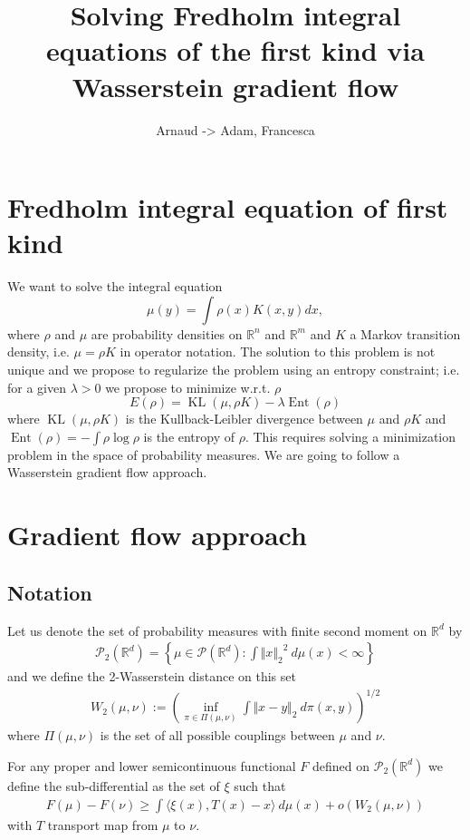 \documentclass[a4paper]{article}
\title{Solving Fredholm integral equations of the first kind via Wasserstein gradient flow}
\author{Arnaud -> Adam, Francesca }
\date{ }
\DeclareMathOperator{\KL}{KL}
\DeclareMathOperator{\ent}{Ent}
\newcommand{\norm}[2]{\ensuremath{\Vert #1 \Vert_{#2}}}
\def\real{\mathbb{R}}
\begin{document}
\maketitle

\section{Fredholm integral equation of first kind}

We want to solve the integral equation
\[
\mu(y)=\int\rho\left(x\right)K(x,y)dx,
\]
where $\rho$ and $\mu$ are probability densities on $\real^{n}$ and $\real^{m}$ and $K$ a Markov transition density, i.e. $\mu=\rho K$ in operator notation. The solution to this problem is not unique and we propose to regularize the problem using an entropy constraint; i.e. for a given $\lambda>0$ we propose to minimize w.r.t. $\rho$
\begin{equation}
\label{eq:minimisation}
E(\rho)=\KL(\mu,\rho K)-\lambda\ent(\rho)
\end{equation}
where 
$\KL(\mu,\rho K)$ is the Kullback-Leibler divergence between $\mu$ and $\rho K$ and $\ent(\rho)=-\int\rho\log\rho$ is the entropy of $\rho$.
This requires solving a minimization problem in the space of probability measures. We are going to follow a Wasserstein gradient flow approach.

\section{Gradient flow approach}
\subsection{Notation}

Let us denote the set of probability measures with finite second moment on $\real^d$ by
\begin{align*}
\mathcal{P}_2(\real^d) = \left\lbrace \mu\in \mathcal{P}(\real^d): \int \norm{ x}{2}^2 \ d\mu(x)< \infty\right\rbrace
\end{align*}
and we define the 2-Wasserstein distance on this set
\begin{align*}
W_2(\mu, \nu) := \left( \inf_{\pi\in\Pi(\mu, \nu)}\int\norm{x - y}{2}\ d\pi(x, y)\right)^{1/2}
\end{align*}
where $\Pi(\mu, \nu)$ is the set of all possible couplings between $\mu$ and $\nu$.

For any proper and lower semicontinuous functional $F$ defined on $\mathcal{P}_2(\real^d)$ we define the sub-differential as the set of $\xi$ such that
\begin{align*}
F(\mu) - F(\nu) \geq \int\langle \xi(x), T(x) - x\rangle\ d\mu(x) +o\left( W_2(\mu, \nu)\right)
\end{align*}
with $T$ transport map from $\mu$ to $\nu$.
\end{document}
